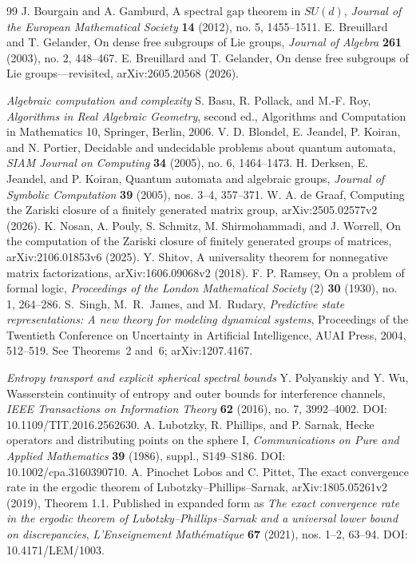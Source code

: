 \begin{thebibliography}{99}
 J. Bourgain and A. Gamburd, A spectral gap theorem in $SU(d)$, \emph{Journal of the European Mathematical Society} \textbf{14} (2012), no. 5, 1455--1511.
 E. Breuillard and T. Gelander, On dense free subgroups of Lie groups, \emph{Journal of Algebra} \textbf{261} (2003), no. 2, 448--467.
 E. Breuillard and T. Gelander, On dense free subgroups of Lie groups---revisited, arXiv:2605.20568 (2026).
\item[]\textit{Algebraic computation and complexity}
 S. Basu, R. Pollack, and M.-F. Roy, \emph{Algorithms in Real Algebraic Geometry}, second ed., Algorithms and Computation in Mathematics 10, Springer, Berlin, 2006.
 V. D. Blondel, E. Jeandel, P. Koiran, and N. Portier, Decidable and undecidable problems about quantum automata, \emph{SIAM Journal on Computing} \textbf{34} (2005), no. 6, 1464--1473.
 H. Derksen, E. Jeandel, and P. Koiran, Quantum automata and algebraic groups, \emph{Journal of Symbolic Computation} \textbf{39} (2005), nos. 3--4, 357--371.
 W. A. de Graaf, Computing the Zariski closure of a finitely generated matrix group, arXiv:2505.02577v2 (2026).
 K. Nosan, A. Pouly, S. Schmitz, M. Shirmohammadi, and J. Worrell, On the computation of the Zariski closure of finitely generated groups of matrices, arXiv:2106.01853v6 (2025).
 Y. Shitov, A universality theorem for nonnegative matrix factorizations, arXiv:1606.09068v2 (2018).
 F. P. Ramsey, On a problem of formal logic, \emph{Proceedings of the London Mathematical Society} (2) \textbf{30} (1930), no. 1, 264--286.
S.~Singh, M.~R.~James, and M.~Rudary,
\emph{Predictive state representations: A new theory for modeling dynamical systems},
Proceedings of the Twentieth Conference on Uncertainty in Artificial Intelligence,
AUAI Press, 2004, 512--519. See Theorems~2 and~6; arXiv:1207.4167.
\item[]\textit{Entropy transport and explicit spherical spectral bounds}
 Y. Polyanskiy and Y. Wu, Wasserstein continuity of entropy and outer bounds for interference channels, \emph{IEEE Transactions on Information Theory} \textbf{62} (2016), no. 7, 3992--4002. DOI: 10.1109/TIT.2016.2562630.
 A. Lubotzky, R. Phillips, and P. Sarnak, Hecke operators and distributing points on the sphere I, \emph{Communications on Pure and Applied Mathematics} \textbf{39} (1986), suppl., S149--S186. DOI: 10.1002/cpa.3160390710.
 A. Pinochet Lobos and C. Pittet, The exact convergence rate in the ergodic theorem of Lubotzky--Phillips--Sarnak, arXiv:1805.05261v2 (2019), Theorem 1.1. Published in expanded form as \emph{The exact convergence rate in the ergodic theorem of Lubotzky--Phillips--Sarnak and a universal lower bound on discrepancies}, \emph{L'Enseignement Math\'ematique} \textbf{67} (2021), nos. 1--2, 63--94. DOI: 10.4171/LEM/1003.

\end{thebibliography}
